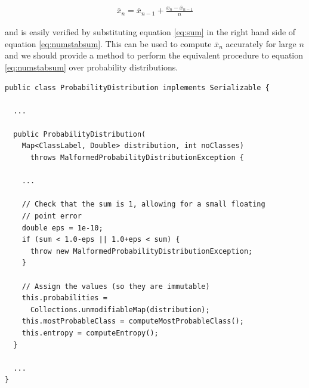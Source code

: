 \documentclass[12pt,twoside,notitlepage]{report}
\begin{document}
                \begin{align}
                    \overline{x}_n = \overline{x}_{n-1} + \frac{x_n - \overline{x}_{n-1}}{n}
                    \label{eq:numstabsum}
                \end{align} 

                and is easily verified by substituting equation \ref{eq:sum} in the right hand side of equation 
                \ref{eq:numstabsum}. This can be used to compute $\overline{x}_n$ accurately for large $n$ and we 
                should provide a method to perform the equivalent procedure to equation \ref{eq:numstabsum} over 
                probability distributions.

                \begin{lstlisting}[float=tp,caption={[The \texttt{ProbabilityDistribution} constructor.] Part of the \texttt{ProbabilityDirstribution} constructor, where we set $\epsilon = 2^{-10}$.}]
public class ProbabilityDistribution implements Serializable {

  ...

  public ProbabilityDistribution(
    Map<ClassLabel, Double> distribution, int noClasses) 
      throws MalformedProbabilityDistributionException {
    
    ...
    
    // Check that the sum is 1, allowing for a small floating 
    // point error
    double eps = 1e-10;
    if (sum < 1.0-eps || 1.0+eps < sum) {
      throw new MalformedProbabilityDistributionException;
    }
    
    // Assign the values (so they are immutable)
    this.probabilities = 
      Collections.unmodifiableMap(distribution);
    this.mostProbableClass = computeMostProbableClass();
    this.entropy = computeEntropy();
  }

  ...
}
                \end{lstlisting}                
\end{document}
